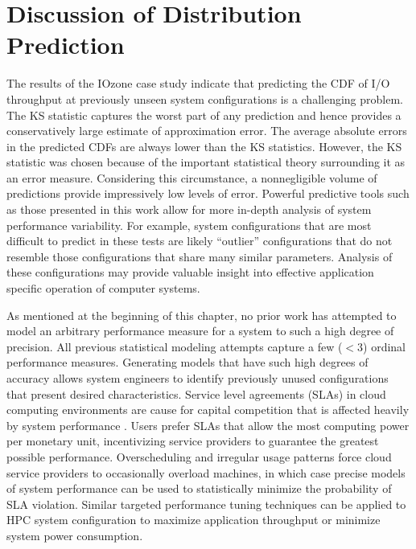 
\section{Discussion of Distribution Prediction}
\label{sec:discussion}

The results of the IOzone case study indicate that predicting the CDF of I/O throughput at previously unseen system configurations is a challenging problem. The KS statistic captures the worst part of any prediction and hence provides a conservatively large estimate of approximation error. The average absolute errors in the predicted CDFs are always lower than the KS statistics. However, the KS statistic was chosen because of the important statistical theory surrounding it as an error measure. Considering this circumstance, a nonnegligible volume of predictions provide impressively low levels of error. Powerful predictive tools such as those presented in this work allow for more in-depth analysis of system performance variability. For example, system configurations that are most difficult to predict in these tests are likely ``outlier'' configurations that do not resemble those configurations that share many similar parameters. Analysis of these configurations may provide valuable insight into effective application specific operation of computer systems.

As mentioned at the beginning of this chapter, no prior work has attempted to model an arbitrary performance measure for a system to such a high degree of precision. All previous statistical modeling attempts capture a few ($<3$) ordinal performance measures. Generating models that have such high degrees of accuracy allows system engineers to identify previously unused configurations that present desired characteristics. Service level agreements (SLAs) in cloud computing environments are cause for capital competition that is affected heavily by system performance \cite{patel2009service}. Users prefer SLAs that allow the most computing power per monetary unit, incentivizing service providers to guarantee the greatest possible performance. Overscheduling and irregular usage patterns force cloud service providers to occasionally overload machines, in which case precise models of system performance can be used to statistically minimize the probability of SLA violation. Similar targeted performance tuning techniques can be applied to HPC system configuration to maximize application throughput or minimize system power consumption.

